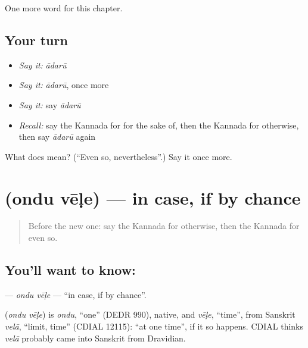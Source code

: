 \begin{grammarlens}[title={What you've built}]
One more word for this chapter.
\end{grammarlens}

\subsection*{Your turn}
\begin{itemize}
\raggedright
  \item \emph{Say it:} \emph{ādarū}
  \item \emph{Say it:} \emph{ādarū}, once more
  \item \emph{Say it:} say \emph{ādarū}
  \item \emph{Recall:} say the Kannada for for the sake of, then the Kannada for otherwise, then say \emph{ādarū} again
\end{itemize}

\begin{tcolorbox}[breakable,colback=teal!4,colframe=teal!35!black,title={Before you move on}]
What does  mean? (\textquotedblleft{}Even so, nevertheless\textquotedblright{}.) Say it once more.
\end{tcolorbox}
\section[\texorpdfstring{\kn{ಒಂದು} \kn{ವೇಳೆ} (ondu vēḷe)}{ಒಂದು ವೇಳೆ (ondu vēḷe)}]{  (ondu vēḷe) — in case, if by chance}

\label{lesson:KA-C176-ondu-vele}



\begin{quote}
Before the new one: say the Kannada for otherwise, then the Kannada for even so.
\end{quote}

\subsection*{You'll want to know:  }
\textbf{ } — \emph{ondu vēḷe} — \textquotedblleft{}in case, if by chance\textquotedblright{}.

\begin{cousinweb}
\textbf{ } (\emph{ondu vēḷe}) is \emph{ondu}, \textquotedblleft{}one\textquotedblright{} (DEDR 990), native, and \emph{vēḷe}, \textquotedblleft{}time\textquotedblright{}, from Sanskrit \emph{velā}, \textquotedblleft{}limit, time\textquotedblright{} (CDIAL 12115): \textquotedblleft{}at one time\textquotedblright{}, if it so happens. CDIAL thinks \emph{velā} probably came into Sanskrit from Dravidian.
\end{cousinweb}

